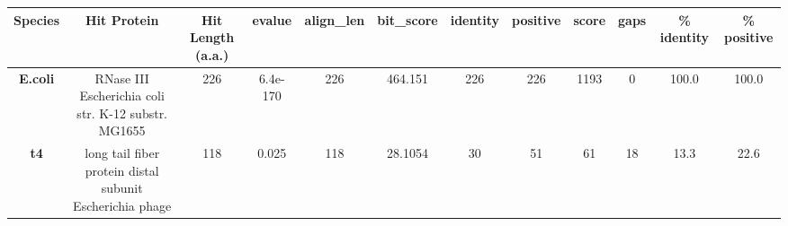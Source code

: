 \begin{tabular}{|c|c|c|c|c|c|c|c|c|c|c|c|} \hline
\textbf{Species} & \textbf{Hit Protein} & \textbf{Hit Length (a.a.)} & \textbf{evalue} & \textbf{align\_len} & \textbf{bit\_score} & \textbf{identity} & \textbf{positive} & \textbf{score} & \textbf{gaps} & \textbf{\% identity} & \textbf{\% positive} \\ \hline
\textbf{E.coli} & RNase III Escherichia coli str. K-12 substr. MG1655 & 226 & 6.4e-170 & 226 & 464.151 & 226 & 226 & 1193 & 0 & 100.0 & 100.0\\
\textbf{t4} & long tail fiber protein distal subunit Escherichia phage  & 118 & 0.025 & 118 & 28.1054 & 30 & 51 & 61 & 18 & 13.3 & 22.6\\
\hline \end{tabular}
